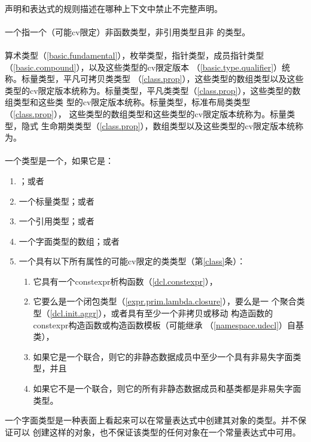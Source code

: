 \paragraph{} %
\begin{note}
  声明和表达式的规则描述在哪种上下文中禁止不完整声明。
\end{note}

\paragraph{} %
一个指一个（可能cv限定）非函数类型，非引用类型且非 
的类型。

\paragraph{} %
算术类型（\ref{basic.fundamental}），枚举类型，指针类型，成员指针类型
（\ref{basic.compound}），以及这些类型的cv限定版本
（\ref{basic.type.qualifier}）统称。标量类型，平凡可拷贝类类型
（\ref{class.prop}），这些类型的数组类型以及这些类型的cv限定版本统称为。标量类型，平凡类类型（\ref{class.prop}），这些类型的数组类型和这些类
型的cv限定版本统称。标量类型，标准布局类类型（\ref{class.prop}），
这些类型的数组类型和这些类型的cv限定版本统称为。标量类型，隐式
生命期类类型（\ref{class.prop}），数组类型以及这些类型的cv限定版本统称为。

\paragraph{} %
一个类型是一个，如果它是：
\begin{enumerate}
  \item {} ；或者
  \item 一个标量类型；或者
  \item 一个引用类型；或者
  \item 一个字面类型的数组；或者
  \item 一个具有以下所有属性的可能cv限定的类类型（第\ref{class}条）：
        \begin{enumerate}
          \item 它具有一个constexpr析构函数（\ref{dcl.constexpr}），
          \item 它要么是一个闭包类型（\ref{expr.prim.lambda.closure}），要么是一
                个聚合类型（\ref{dcl.init.aggr}），或者具有至少一个非拷贝或移动
                构造函数的constexpr构造函数或构造函数模板（可能继承
                （\ref{namespace.udecl}）自基类），
          \item 如果它是一个联合，则它的非静态数据成员中至少一个具有非易失字面类
                型，并且
          \item 如果它不是一个联合，则它的所有非静态数据成员和基类都是非易失字面
                类型。
        \end{enumerate}
\end{enumerate}
\begin{note}
  一个字面类型是一种表面上看起来可以在常量表达式中创建其对象的类型。并不保证可以
  创建这样的对象，也不保证该类型的任何对象在一个常量表达式中可用。
\end{note}

